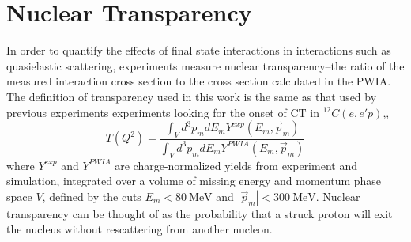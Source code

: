 \section{Nuclear Transparency}
In order to quantify the effects of final state interactions in interactions
such as quasielastic scattering, experiments measure nuclear transparency--the
ratio of
the measured interaction cross section
to
the cross section calculated in the PWIA.
The definition of transparency used in this work is the same as that used by
previous experiments experiments looking for the onset of CT in
${}^{12}C(e,e'p)$,,
\begin{equation} \label{eqn:transparency_definition}
    T(Q^2) = \frac{\int_{V} d^{3} p_{m} d E_{m} Y^{exp }(E_{m}, \vec{p}_{m})}
                  {\int_{V} d^{3} p_{m} d E_{m} Y^{PWIA}(E_{m}, \vec{p}_{m})}
\end{equation}
where $Y^{exp}$ and $Y^{PWIA}$ are charge-normalized yields from experiment and
simulation, integrated over a volume of missing energy and momentum phase space
$V$, defined by the cuts $E_m < \SI{80}{\mega\electronvolt}$ and
$|\vec{p}_m| < \SI{300}{\mega\electronvolt}$.
Nuclear transparency can be thought of as the probability that a struck proton
will exit the nucleus without rescattering from another nucleon.
